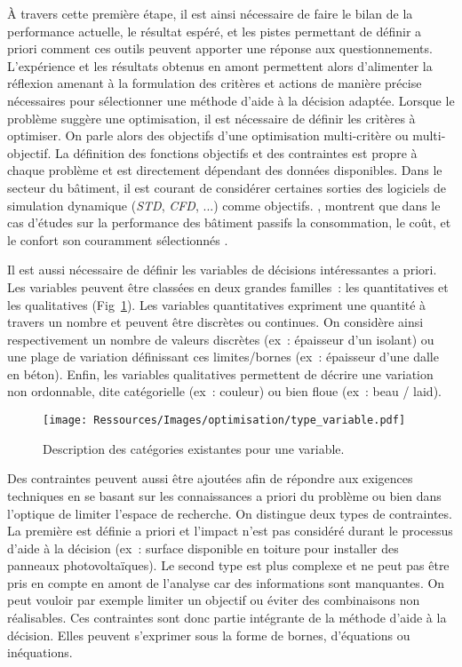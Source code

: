 À travers cette première étape, il est ainsi nécessaire de faire le bilan de la
performance actuelle, le résultat espéré, et les pistes permettant de définir a priori
comment ces outils peuvent apporter une réponse aux questionnements. L’expérience et les
résultats obtenus en amont permettent alors d’alimenter la réflexion amenant à la
formulation des critères et actions de manière précise nécessaires pour sélectionner une
méthode d’aide à la décision adaptée. Lorsque le problème suggère une optimisation, il est
nécessaire de définir les critères à optimiser. On parle alors des objectifs d’une
optimisation multi-critère ou multi-objectif. La définition des fonctions objectifs et des
contraintes est propre à chaque problème et est directement dépendant des données
disponibles. Dans le secteur du bâtiment, il est courant de considérer certaines sorties
des logiciels de simulation dynamique (\textit{STD}, \textit{CFD}, ...) comme objectifs.
\textcite{Attia2013110}, montrent que dans le cas d’études sur la performance des bâtiment
passifs la consommation, le coût, et le confort son couramment sélectionnés .

Il est aussi nécessaire de définir les variables de décisions intéressantes a priori.
Les variables peuvent être classées en deux grandes familles~: les quantitatives et
les qualitatives (Fig~\ref{fig:type_variable}).
Les variables quantitatives expriment une quantité à travers un nombre et
peuvent être discrètes ou continues. On considère ainsi respectivement un nombre de
valeurs discrètes (ex~: épaisseur d’un isolant) ou une plage de variation définissant
ces limites/bornes (ex~: épaisseur d’une dalle en béton).
Enfin, les variables qualitatives permettent de décrire une variation non ordonnable,
dite catégorielle (ex~: couleur) ou bien floue (ex~: beau / laid).

\begin{figure}
    \begin{center}
        \texttt{[image: Ressources/Images/optimisation/type\_variable.pdf]}
    \end{center}
    \caption{Description des catégories existantes pour une variable.
             \label{fig:type_variable}}
\end{figure}

Des contraintes peuvent aussi être ajoutées afin de répondre aux exigences
techniques en se basant sur les connaissances a priori du problème ou bien dans
l’optique de limiter l’espace de recherche. On distingue deux types de contraintes.
La première est définie a priori et l’impact n’est pas considéré durant le processus
d’aide à la décision (ex~: surface disponible en toiture pour installer des
panneaux photovoltaïques).
Le second type est plus complexe et ne peut pas être pris en compte en amont de
l’analyse car des informations sont manquantes. On peut vouloir par exemple limiter
un objectif ou éviter des combinaisons non réalisables. Ces contraintes sont donc
partie intégrante de la méthode d’aide à la décision.
Elles peuvent s’exprimer sous la forme de bornes, d’équations ou inéquations.

